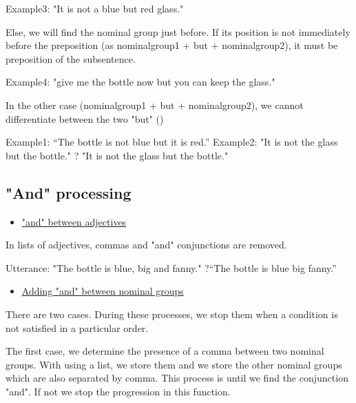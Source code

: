 \documentclass[twoside,a4paper,10pt]{report}
\begin{document}
\small
\begin{verbatimtab}
  Example3: "It is not a blue but red glass."
\end{verbatimtab}
\normalsize
Else, we will find the nominal group just before. If its position is not immediately before the preposition (as nominal{\textunderscore}group1 + but + nominal{\textunderscore}group2), it must be preposition of the subsentence.


\small
\begin{verbatimtab}
  Example4: "give me the bottle now but you can keep the glass."
\end{verbatimtab}
\normalsize
In the other case (nominal{\textunderscore}group1 + but + nominal{\textunderscore}group2), we cannot differentiate between the two "but" ()


\small
\begin{verbatimtab}
  Example1: “The bottle is not blue but it is red.” 
  Example2: "It is not the glass but the bottle." ? "It is not the glass but the bottle."
\end{verbatimtab}
\normalsize

\subsection{"And" processing}
\label{3dd83b6ed393cdcc2a450375a4147efc}%

\begin{itemize}
    \item  \underline{"and" between adjectives}
\end{itemize}
In lists of adjectives, commas and "and" conjunctions are removed.


\small
\begin{verbatimtab}
  Utterance: "The bottle is blue, big and fanny."
  ?“The bottle is blue big fanny.”
\end{verbatimtab}
\normalsize

\begin{itemize}
    \item  \underline{Adding "and" between nominal groups}
\end{itemize}
There are two cases. During these processes, we stop them when a condition is not satisfied in a particular order.

The first case, we determine the presence of a comma between two nominal groups. With using a list, we store them and we store the other nominal groups which are also separated by comma. This process is until we find the conjunction "and". If not we stop the progression in this function. 
\end{document}
